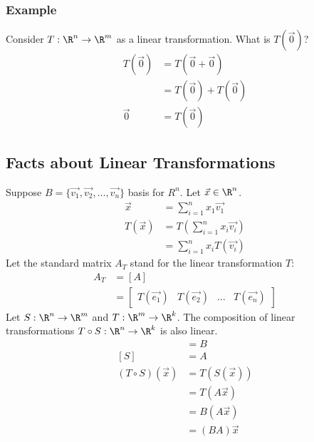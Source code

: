 \documentclass{math}
\begin{document}
\subsubsection*{Example}
Consider \( T:\R^n\to\R^m \) as a linear transformation. What is \( T(\vec{0})
\)?
\begin{align*}
  T(\vec{0}) &= T(\vec{0}+\vec{0}) \\
  &= T(\vec{0})+T(\vec{0}) \\
  \vec{0} &= T(\vec{0})
\end{align*}

\subsection*{Facts about Linear Transformations}
Suppose \( B = \{\vec{v_1},\vec{v_2},\dots,\vec{v_n}\} \) basis for \( R^n \).
Let \( \vec{x}\in\R^n \).
\begin{align*}
  \vec{x} &= \sum_{i=1}^{n}x_1\vec{v_1} \\
  T(\vec{x}) &= T\left(\sum_{i=1}^{n}x_i\vec{v_i}\right) \\
  &= \sum_{i=1}^{n}x_iT(\vec{v_i})
\end{align*}
Let the standard matrix \( A_T \) stand for the linear transformation \( T \):
\begin{align*}
  A_T &= [A] \\
  &= \begin{bmatrix}
    T(\vec{e_1}) & T(\vec{e_2}) & \dots & T(\vec{e_n})
  \end{bmatrix}
\end{align*}
Let \( S:\R^n\to\R^m \) and \( T:\R^m\to\R^k \). The composition of linear
transformations \( T\circ S:\R^n\to\R^k \) is also linear.
\begin{align*}
  [T] &= B \\
  [S] &= A \\
  (T\circ S)(\vec{x}) &= T(S(\vec{x})) \\
  &= T(A\vec{x}) \\
  &= B(A\vec{x}) \\
  &= (BA)\vec{x}
\end{align*}
\end{document}
